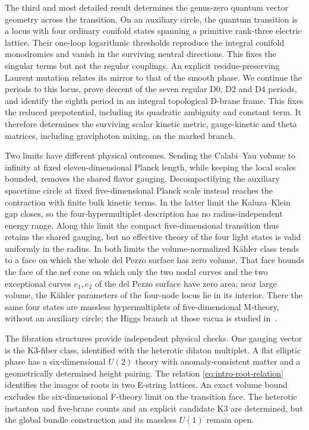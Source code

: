 The third and most detailed result determines the genus-zero
quantum vector geometry across the transition. On an auxiliary
circle, the quantum transition is a locus with four ordinary
conifold states spanning a primitive rank-three electric
lattice. Their one-loop logarithmic thresholds reproduce the
integral conifold monodromies and vanish in the surviving neutral
directions. This fixes the singular terms but not the regular
couplings. An explicit residue-preserving Laurent mutation
relates its mirror to that of the smooth phase. We continue
the periods to this locus, prove descent of the seven regular
D0, D2 and D4 periods, and identify the eighth period in an
integral topological D-brane frame. This fixes the reduced
prepotential, including its quadratic ambiguity and constant
term. It therefore determines the surviving scalar kinetic metric,
gauge-kinetic and theta matrices, including graviphoton mixing,
on the marked branch.

Two limits have different physical outcomes. Sending the Calabi--Yau
volume to infinity at fixed eleven-dimensional Planck length, while
keeping the local scales bounded, removes the shared flavor gauging.
Decompactifying the auxiliary spacetime circle at fixed five-dimensional
Planck scale instead reaches the contraction with finite bulk kinetic
terms. In the latter limit the Kaluza--Klein gap closes, so the
four-hypermultiplet description has no radius-independent energy range.
Along this limit the compact five-dimensional transition thus retains
the shared gauging, but no effective theory of the four light states is
valid uniformly in the radius.
In both limits the volume-normalized K\"ahler class tends to a face on
which the whole del Pezzo surface has zero volume. That face bounds the
face of the nef cone on which only the two nodal curves and the two
exceptional curves $e_1,e_2$ of the del Pezzo surface have zero area;
near large volume, the K\"ahler parameters of the four-node locus lie in its interior. There
the same four states
are massless hypermultiplets of five-dimensional M-theory, without an
auxiliary circle; the Higgs branch at those vacua is studied
in~\cite{Wuebben:2026finiteplanck}.

The fibration structures provide independent physical checks.
One gauging vector is the K3-fiber class, identified with
the heterotic dilaton multiplet. A flat elliptic phase has a
six-dimensional $U(2)$ theory with anomaly-consistent matter
and a geometrically determined height pairing. The relation
\eqref{eq:intro-root-relation} identifies the images of roots
in two E-string lattices. An exact volume bound excludes the
six-dimensional F-theory limit on the transition face. The
heterotic instanton and five-brane counts and an explicit
candidate K3 are determined, but the global bundle construction
and its massless $U(1)$ remain open.

